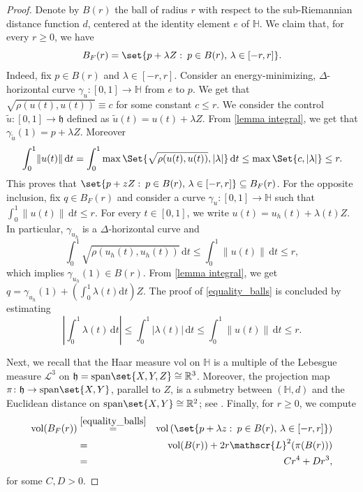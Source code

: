 \documentclass[a4paper,11pt,reqno]{amsart}
\theoremstyle{plain}
\theoremstyle{definition}
\newcommand{\R}{\mathbb R}
\renewcommand{\H}{\mathbb H}
\newcommand{\spn}{\mathrm{span}}
\newcommand{\vol}{\mathrm{vol}}
\newcommand{\id}{e}
\newcommand{\de}{\mathrm{d}}
\begin{document}
\begin{proof}
 Denote by $B(r)$ the ball of radius $r$ with respect to the sub-Riemannian distance function $d$, centered at the identity element $\id$ of $\H$. We claim that, for every $r \ge 0$, we have 
 \begin{equation} \label{equality_balls}
 B_F(r)= \set{p+ \lambda Z \,\colon \, p \in B(r), \, \lambda \in [-r,r]}.
 \end{equation}
 Indeed, fix $p \in B(r)$ and $\lambda \in [-r,r]$. Consider an energy-minimizing, $\Delta$-horizontal curve $\gamma_u \colon [0,1] \to \H$ from $\id$ to $p$. We get that $\sqrt{\rho(u(t),u(t))}\equiv c$ for some constant $c \le r$. We consider the control $\widetilde{u} \colon [0,1] \to \mathfrak{h}$ defined as $\widetilde{u}(t)=u(t) + \lambda Z$. From \cref{lemma integral}, we get that $\gamma_{\tilde{u}}(1) = p + \lambda Z$. Moreover
 \begin{equation*}
 \int^1_0 \lVert u(t) \rVert \, \de t = \int^1_0 \max \Set{\sqrt{\rho(u(t),u(t))}, \lvert \lambda \rvert} \, \de t \le \max \Set{c, \lvert \lambda \rvert}\le r.
 \end{equation*}
 This proves that $\set{p+zZ \,\colon \, p \in B(r), \, \lambda \in [-r,r]} \subseteq B_F(r)$. For the opposite inclusion, fix $q \in B_F(r)$ and consider a curve $\gamma_u \colon [0,1] \to \H$ such that $\int^1_0 \lVert u(t) \rVert \, \de t \le r$. 
 For every $t \in [0,1]$, we write $u(t) = u_h(t) + \lambda(t) Z$. In particular, $\gamma_{u_h}$ is a $\Delta$-horizontal curve and 
 \begin{equation*}
 \int^1_0 \sqrt{\rho(u_h(t),u_h(t))} \, \de t \le \int^1_0 \lVert u(t) \rVert \, \de t \le r,
 \end{equation*}
 which implies $\gamma_{u_h}(1) \in B(r)$. From \cref{lemma integral}, we get $q = \gamma_{u_h}(1) + \left(\int^1_0 \lambda(t) \de t\right)Z$. The proof of \eqref{equality_balls} is concluded by estimating
 \begin{equation*}
 \left\lvert \int^1_0 \lambda(t) \, \de t \right\rvert \le \int^1_0 \lvert \lambda(t) \rvert \, \de t \le \int^1_0 \lVert u(t)\rVert \, \de t \le r.
 \end{equation*}

 Next, we recall that the Haar measure $\vol$ on $\H$ is a multiple of the Lebesgue measure $\mathscr{L}^3$ on $\mathfrak{h} = \spn\set{X,Y,Z} \cong \R^3$. Moreover, the projection map $\pi \colon \mathfrak{h} \to \spn\set{X,Y}$, parallel to $Z$, is a submetry between $(\H,d)$ and the Euclidean distance on $\spn\set{X,Y} \cong \R^2$; see \cite[Proposition~7.1.9]{donne2024metricliegroupscarnotcaratheodory}. Finally, for $r \ge 0$, we compute
 \begin{eqnarray*}
 \vol(B_F(r)) &\stackrel{\eqref{equality_balls}}{=}& 
 \vol \left( \set{p+\lambda z \,\colon \, p \in B(r), \, \lambda \in [-r,r]} \right) \\
 &=& \vol(B(r)) + 2r \mathscr{L}^2(\pi(B(r))) \\
 &=& Cr^4 + Dr^3, 
 \end{eqnarray*}
 for some $C,D>0$.
\end{proof}
\end{document}
